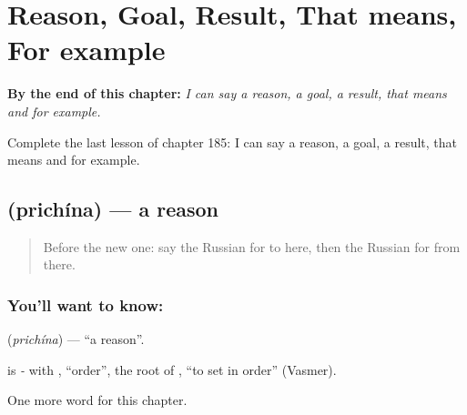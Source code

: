 
\chapter{Reason, Goal, Result, That means, For example}
\label{ch:ru-reason-goal-result-that-means-for-example}

\begin{chapteropening}
\textbf{By the end of this chapter:} \emph{I can say a reason, a goal, a result, that means and for example.}

Complete the last lesson of chapter 185: I can say a reason, a goal, a result, that means and for example.
\end{chapteropening}

\section[\texorpdfstring{\ru{причина} (prichína)}{причина (prichína)}]{ (prichína) — a reason}

\label{lesson:RU-C185-prichina}



\begin{quote}
Before the new one: say the Russian for to here, then the Russian for from there.
\end{quote}

\subsection*{You'll want to know: }
\textbf{} (\emph{prichína}) — \textquotedblleft{}a reason\textquotedblright{}.

\begin{cousinweb}
\textbf{} is \emph{-} with \emph{}, \textquotedblleft{}order\textquotedblright{}, the root of \emph{}, \textquotedblleft{}to set in order\textquotedblright{} (Vasmer).
\end{cousinweb}

\begin{grammarlens}[title={What you've built}]
One more word for this chapter.
\end{grammarlens}

